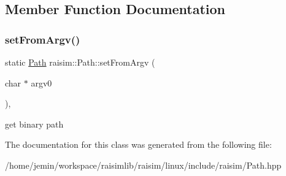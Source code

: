 \subsection{Member Function Documentation}
\mbox{\label{classraisim_1_1Path_a0e4dade2e046891b1737b16c36af74b7}} 
\subsubsection{\texorpdfstring{set\+From\+Argv()}{setFromArgv()}}
{\footnotesize\ttfamily static \hyperlink{classraisim_1_1Path}{Path} raisim\+::\+Path\+::set\+From\+Argv (\begin{DoxyParamCaption}\item[{char $\ast$}]{argv0 }\end{DoxyParamCaption})\hspace{0.3cm}{\ttfamily [inline]}, {\ttfamily [static]}}

get binary path 

The documentation for this class was generated from the following file\+:\begin{DoxyCompactItemize}
\item 
/home/jemin/workspace/raisimlib/raisim/linux/include/raisim/Path.\+hpp\end{DoxyCompactItemize}
